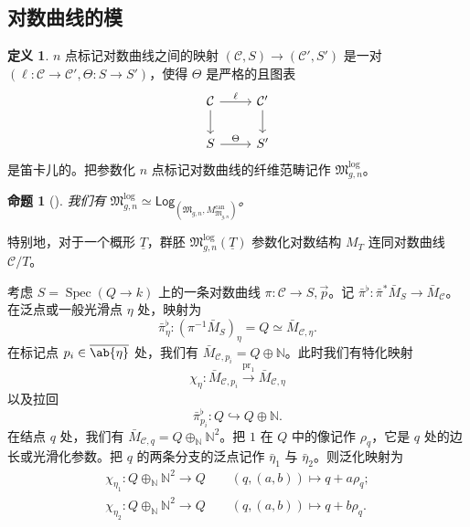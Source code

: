 \documentclass{amsart}
\newtheorem{prop}[thm]{命题}
\theoremstyle{definition}
\newtheorem{defn}[thm]{定义}
\theoremstyle{remark}
\theoremstyle{plain}
\theoremstyle{definition}
\theoremstyle{remark}
\newcommand{\N}{\mathbb{N}}
\newcommand{\mc}[1]{\mathcal{#1}}
\newcommand{\mf}[1]{\mathfrak{#1}}
\newcommand{\on}[1]{\operatorname{#1}}
\newcommand{\ms}[1]{\mathsf{#1}}
\newcommand{\ol}[1]{\overline{#1}}
\newcommand{\ul}[1]{\underline{#1}}
\newcommand{\1}{\mathbf{1}}
\newcommand{\2}{\mathbf{2}}
\newcommand{\3}{\mathbf{3}}
\DeclareMathOperator{\Spec}{Spec}
\begin{document}
\subsection{对数曲线的模}%
\label{sub:Moduli of log curves}

\begin{defn}
    \(n\) 点标记对数曲线之间的映射 \((\mc{C}, S) \to (\mc{C}', S')\) 是一对 \((\ell \colon \mc{C} \to \mc{C}', \Theta \colon S \to S')\)，使得 \(\Theta\) 是严格的且图表
    \begin{equation*}
    \begin{tikzcd}
        \mc{C} \ar{d} \ar{r}{\ell} & \mc{C}' \ar{d} \\
        S \ar{r}{\Theta} & S'
    \end{tikzcd}
    \end{equation*}
    是笛卡儿的。把参数化 \(n\) 点标记对数曲线的纤维范畴记作 \(\mf{M}_{g,n}^{\log}\)。
\end{defn}

\begin{prop}[{\cite{FKato2000,Olsson2003}}]
    我们有 \(\mf{M}_{g,n}^{\log} \simeq \ms{Log}_{(\mf{M}_{g,n}, M_{\mf{M}_{g,n}}^{\on{can}})}\)。
\end{prop}

特别地，对于一个概形 \(\ul{T}\)，群胚 \(\mf{M}_{g,n}^{\log}(\ul{T})\) 参数化对数结构 \(M_T\) 连同对数曲线 \(\mc{C} / T\)。

考虑 \(S = \Spec (Q \to k)\) 上的一条对数曲线 \(\pi \colon \mc{C} \to S, \vec{p}\)。记 \(\bar{\pi}^{\flat} \colon \bar{\pi}^* \bar{M}_S \to \bar{M}_{\mc{C}}\)。在泛点或一般光滑点 \(\eta\) 处，映射为
\[ \bar{\pi}_{\eta}^{\flat} \colon (\pi^{-1} \bar{M}_S)_{\eta} = Q \simeq \bar{M}_{\mc{C}, \eta}. \]
在标记点 \(p_i \in \ol{\ab\{\eta\}}\) 处，我们有 \(\bar{M}_{\mc{C}, p_i} = Q \oplus \N\)。此时我们有特化映射
\[ \chi_{\eta} \colon \bar{M}_{\mc{C}, p_i} \xrightarrow{\on{pr}_1} \bar{M}_{\mc{C}, \eta} \]
以及拉回
\[ \bar{\pi}_{p_i}^{\flat} \colon Q \hookrightarrow Q \oplus \N. \]
在结点 \(q\) 处，我们有 \(\bar{M}_{\mc{C}, q} = Q \oplus_{\N} \N^2\)。把 \(1\) 在 \(Q\) 中的像记作 \(\rho_q\)，它是 \(q\) 处的边长或光滑化参数。把 \(q\) 的两条分支的泛点记作 \(\bar{\eta}_1\) 与 \(\bar{\eta}_2\)。则泛化映射为
\begin{align*}
    \chi_{\eta_1} \colon Q \oplus_{\N} \N^2 \to Q \qquad (q, (a,b)) \mapsto q + a \rho_q ;\\
    \chi_{\eta_2} \colon Q \oplus_{\N} \N^2 \to Q \qquad (q, (a,b)) \mapsto q + b \rho_q .
\end{align*}
\end{document}
